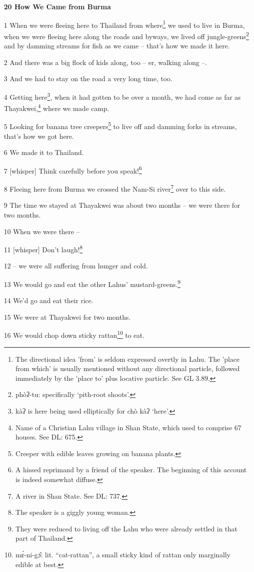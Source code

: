 
\textbf{20 How We Came from Burma}

1 When we were fleeing here to Thailand from where\footnote{The directional idea 'from' is seldom expressed overtly in Lahu. The 'place from which' is usually mentioned without any directional particle, followed immediately by the 'place to' plus locative particle. See GL 3.89.} we used to live in Burma,
when we were fleeing here along the roads and byways, we lived off jungle-greens\footnote{phòʔ-tu: specifically `pith-root shoots'.}
and by damming streams for fish as we came -- that's how we made it here.

2 And there was a big flock of kids along, too -- er, walking along --.

3 And we had to stay on the road a very long time, too.

4 Getting here\footnote{kàʔ is here being used elliptically for chò kàʔ `here'.}, when it had gotten to be over a month, we had come as far as
Thayakwei,\footnote{Name of a Christian Lahu village in Shan State, which used to comprise 67 houses. See DL: 675.} where we made camp.

5 Looking for banana tree creepers\footnote{Creeper with edible leaves growing on banana plants.} to live off and damming forks in streams,
that's how we got here.

6 We made it to Thailand.

7 [whisper] Think carefully before you speak!\footnote{A hissed reprimand by a friend of the speaker. The beginning of this account is indeed somewhat diffuse.}

8 Fleeing here from Burma we crossed the Nam-Si river\footnote{A river in Shan State. See DL: 737.} over to this side.

9 The time we stayed at Thayakwei was about two months -- we were there for two
months.

10 When we were there --

11 [whisper] Don't laugh!\footnote{The speaker is a giggly young woman.}

12 -- we were all suffering from hunger and cold.

13 We would go and eat the other Lahus' mustard-greens.\footnote{They were reduced to living off the Lahu who were already settled in that part of Thailand.}

14 We'd go and eat their rice.

15 We were at Thayakwei for two months.

16 We would chop down sticky rattan\footnote{mɛ́-ni-gɔ̂: lit. ``cat-rattan'', a small sticky kind of rattan only marginally edible at best.} to eat.


